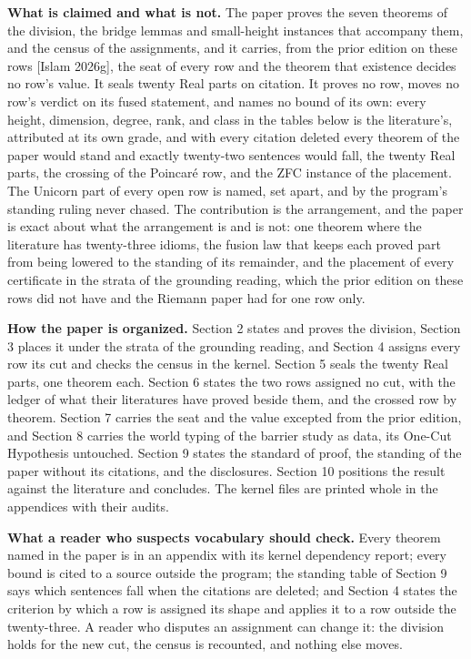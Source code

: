 \documentclass[10pt,twocolumn]{article}
\begin{document}
\textbf{What is claimed and what is not.} The paper proves the seven
theorems of the division, the bridge lemmas and small-height instances
that accompany them, and the census of the assignments, and it carries,
from the prior edition on these rows {[}Islam 2026g{]}, the seat of
every row and the theorem that existence decides no row's value. It
seals twenty Real parts on citation. It proves no row, moves no row's
verdict on its fused statement, and names no bound of its own: every
height, dimension, degree, rank, and class in the tables below is the
literature's, attributed at its own grade, and with every citation
deleted every theorem of the paper would stand and exactly twenty-two
sentences would fall, the twenty Real parts, the crossing of the
Poincaré row, and the ZFC instance of the placement. The Unicorn part of
every open row is named, set apart, and by the program's standing ruling
never chased. The contribution is the arrangement, and the paper is
exact about what the arrangement is and is not: one theorem where the
literature has twenty-three idioms, the fusion law that keeps each
proved part from being lowered to the standing of its remainder, and the
placement of every certificate in the strata of the grounding reading,
which the prior edition on these rows did not have and the Riemann paper
had for one row only.

\textbf{How the paper is organized.} Section 2 states and proves the
division, Section 3 places it under the strata of the grounding reading,
and Section 4 assigns every row its cut and checks the census in the
kernel. Section 5 seals the twenty Real parts, one theorem each. Section
6 states the two rows assigned no cut, with the ledger of what their
literatures have proved beside them, and the crossed row by theorem.
Section 7 carries the seat and the value excepted from the prior
edition, and Section 8 carries the world typing of the barrier study as
data, its One-Cut Hypothesis untouched. Section 9 states the standard of
proof, the standing of the paper without its citations, and the
disclosures. Section 10 positions the result against the literature and
concludes. The kernel files are printed whole in the appendices with
their audits.

\textbf{What a reader who suspects vocabulary should check.} Every
theorem named in the paper is in an appendix with its kernel dependency
report; every bound is cited to a source outside the program; the
standing table of Section 9 says which sentences fall when the citations
are deleted; and Section 4 states the criterion by which a row is
assigned its shape and applies it to a row outside the twenty-three. A
reader who disputes an assignment can change it: the division holds for
the new cut, the census is recounted, and nothing else moves.
\end{document}
